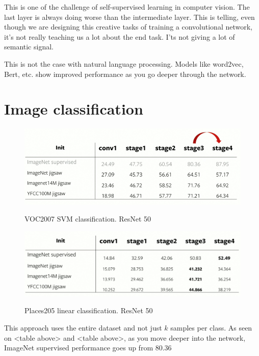 This is one of the challenge of self-supervised learning in computer vision. The last layer is always doing worse than the intermediate layer. This is telling, even though we are designing this creative tasks of training a convolutional network, it’s not really teaching us a lot about the end task. I’ts not giving a lot of semantic signal.

This is not the case with natural language processing. Models like word2vec, Bert, etc. show improved performance as you go deeper through the network. 

\section{Image classification}

\begin{figure}[htb!]
\centering
\includegraphics[width=0.8\linewidth]{lectures/14-b/graphics/VOC2007_SVM_classification.png}
\label{fig:VOC2007_SVM_classification}
\caption{VOC2007 SVM classification. ResNet 50}
\end{figure}

\begin{figure}[htb!]
\centering
\includegraphics[width=0.8\linewidth]{lectures/14-b/graphics/Places205_linear_classification.png}
\label{fig:Places205_linear_classification}
\caption{Places205 linear classification. ResNet 50}
\end{figure}

This approach uses the entire dataset and not just $k$ samples per class.  As seen on <table above> and <table above>, as you move deeper into the network, ImageNet supervised performance goes up from 80.36%

